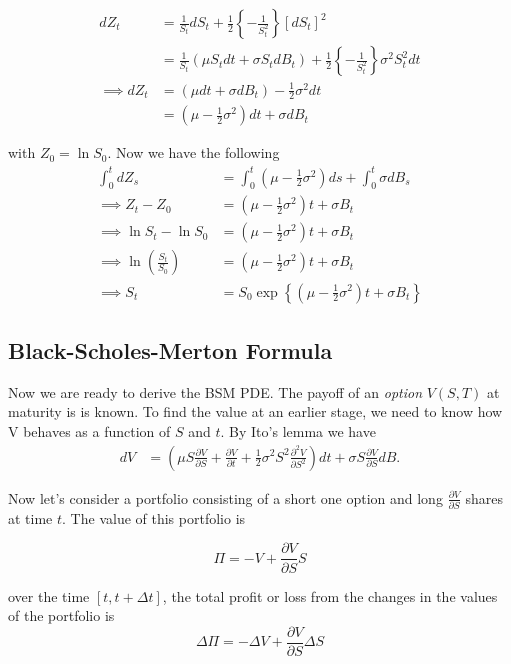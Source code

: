 \documentclass[
  letterpaper,
  DIV=11,
  numbers=noendperiod]{scrartcl}
\begin{document}
\begin{align*}
dZ_t & = \frac{1}{S_t} dS_t + \frac{1}{2} \left\{-\frac{1}{S_t^2}\right\}[dS_t]^2\\
& =  \frac{1}{S_t} (\mu S_t dt+\sigma S_t dB_t) + \frac{1}{2} \left\{-\frac{1}{S_t^2}\right\}\sigma^2S_t^2dt\\
\implies dZ_t &= (\mu dt +\sigma dB_t) -\frac{1}{2}\sigma^2 dt\\
& = \left(\mu-\frac{1}{2}\sigma^2\right)dt+\sigma dB_t
\end{align*}

with \(Z_0=\ln S_0\). Now we have the following\\
\begin{align*}
\int_0^t dZ_s &= \int_0^t \left(\mu-\frac{1}{2}\sigma^2\right)ds + \int_0^t\sigma dB_s\\
\implies Z_t - Z_0 &= \left(\mu-\frac{1}{2}\sigma^2\right)t + \sigma B_t\\
\implies \ln S_t - \ln S_0&= \left(\mu-\frac{1}{2}\sigma^2\right)t + \sigma B_t\\
\implies \ln \left(\frac{S_t}{S_0}\right) &= \left(\mu-\frac{1}{2}\sigma^2\right)t + \sigma B_t\\
\implies S_t &= S_0 \exp{\left\{\left(\mu-\frac{1}{2}\sigma^2\right)t + \sigma B_t\right\}}
\end{align*}

\subsection{Black-Scholes-Merton
Formula}\label{black-scholes-merton-formula}

Now we are ready to derive the BSM PDE. The payoff of an \emph{option}
\(V(S,T)\) at maturity is is known. To find the value at an earlier
stage, we need to know how V behaves as a function of \(S\) and \(t\).
By Ito's lemma we have \begin{align*}
dV& = \left(\mu S\frac{\partial V}{\partial S}+\frac{\partial V}{\partial t}+\frac{1}{2}\sigma^2S^2\frac{\partial^2 V}{\partial S^2}\right)dt+\sigma S\frac{\partial V}{\partial S}dB.
\end{align*}

Now let's consider a portfolio consisting of a short one option and long
\(\frac{\partial V}{\partial S}\) shares at time \(t\). The value of
this portfolio is

\[
\Pi = -V+\frac{\partial V}{\partial S}S
\]

over the time \([t,t+\Delta t]\), the total profit or loss from the
changes in the values of the portfolio is \[
\Delta \Pi = -\Delta V + \frac{\partial V}{\partial S}\Delta S
\]
\end{document}
